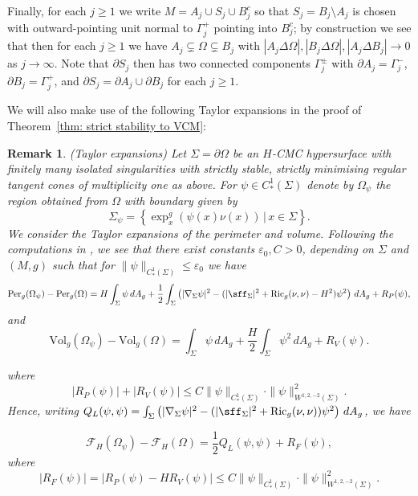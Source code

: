 \documentclass[12pt]{article}
\newtheorem{remark}{Remark}
\begin{document}
    \bigskip
    
    Finally, for each $j \geq 1$ we write $M = A_j \cup S_j \cup B_j^c$ so that $S_j = B_j \setminus A_j$ is chosen with outward-pointing unit normal to $\Gamma_j^+$ pointing into $B_j^c$; by construction we see that then for each $j \geq 1$ we have $A_j \subsetneq \Omega \subsetneq B_j$ with $|A_j \Delta \Omega|, |B_j \Delta \Omega|, |A_j \Delta B_j| \rightarrow 0$ as $j \rightarrow \infty$. Note that $\partial S_j$ then has two connected components $\Gamma^\pm_j$ with $\partial A_j = \Gamma_j^-$, $\partial B_j = \Gamma_j^+$, and $\partial S_j = \partial A_j \cup \partial B_j$ for each $j \geq 1$.

    \bigskip

    We will also make use of the following Taylor expansions in the proof of Theorem~\ref{thm: strict stability to VCM}:
    
\begin{remark}\label{rem: Taylor expansion}(Taylor expansions)
    Let $\Sigma=\partial \Omega$ be an $H$-CMC hypersurface with finitely many isolated singularities with strictly stable, strictly minimising regular tangent cones of multiplicity one as above. For $\psi\in C^1_*(\Sigma)$ denote by $\Omega_{\psi}$ the region obtained from $\Omega$ with boundary given by
    $$
      \Sigma_{\psi}= \left\{
        \exp_x^g\left(\psi(x)\nu(x)\right)
        \, | \,
        x\in\Sigma
        \right\}.
    $$
    We consider the Taylor expansions of the perimeter and volume. Following the computations in \cite[Appendix B]{LW25}, we see that there exist constants $\varepsilon_0,C>0$, depending on $\Sigma$ and $(M,g)$ such that for $\|\psi\|_{C^1_*(\Sigma)}\le \varepsilon_0$ we have
    $$
    \mathrm{Per}_g(\Omega_{\psi})
    -\mathrm{Per}_g(\Omega)
    =
    H\int_\Sigma\psi\,dA_g + 
    \frac{1}{2}\int_\Sigma
    \left(
    |\nabla_\Sigma\psi|^2-(|\sff_\Sigma|^2+\mathrm{Ric}_g(\nu,\nu)-H^2) \psi^2
    \right)\,dA_g +R_P(\psi),
    $$
    and 
    $$
    \mathrm{Vol}_g(\Omega_{\psi}) - \mathrm{Vol}_g(\Omega)
    =
    \int_\Sigma\psi\,dA_g
    +\frac{H}{2}\int_\Sigma\psi^2\,dA_g
    +R_V(\psi).
    $$
    
    where
    $$
        |R_P(\psi)|+|R_V(\psi)|
    \leq
    C\|\psi\|_{C^1_*(\Sigma)}\cdot
    \|\psi\|_{W^{1,2,-2}(\Sigma)}^2.
    $$
    Hence, writing $Q_L(\psi,\psi) = \int_\Sigma
    \left(
    |\nabla_\Sigma\psi|^2-(|\sff_\Sigma|^2+\mathrm{Ric}_g(\nu,\nu))\psi^2
    \right)\,dA_g$, we have

    \begin{equation}\label{eqn: Taylor expansion of F_H}
        \mathcal F_H(\Omega_{\psi})-\mathcal F_H(\Omega)
    =
    \frac{1}{2}Q_L(\psi,\psi)
    +R_F(\psi),
    \end{equation}
    where
    \begin{equation}\label{eqn: Taylor expansion error}
      | R_F(\psi)| = |R_P(\psi)-H R_V(\psi)| \leq
    C\|\psi\|_{C^1_*(\Sigma)}\cdot
    \|\psi\|_{W^{1,2,-2}(\Sigma)}^2.
    \end{equation}
    \end{remark}
\end{document}
